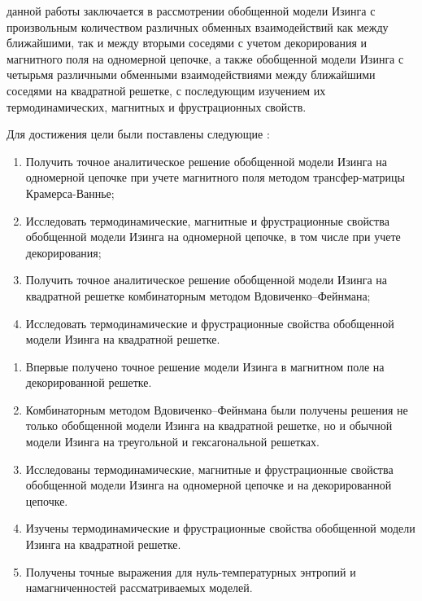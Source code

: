 {\aim} данной работы заключается в рассмотрении обобщенной	модели Изинга с произвольным количеством различных обменных взаимодействий как между ближайшими, так и между вторыми соседями с учетом декорирования и магнитного поля на одномерной цепочке, а также обобщенной модели Изинга с четырьмя различными обменными взаимодействиями между ближайшими соседями на квадратной решетке, с последующим изучением их термодинамических, магнитных и фрустрационных свойств.

Для достижения цели были поставлены следующие {\tasks}:
\begin{enumerate}[beginpenalty=10000] %
  \item Получить точное аналитическое решение обобщенной модели Изинга на одномерной цепочке при учете магнитного поля методом трансфер-матрицы Крамерса-Ваннье;
  \item Исследовать термодинамические, магнитные и фрустрационные свойства обобщенной модели Изинга на одномерной цепочке, в том числе при учете декорирования; 
  \item Получить точное аналитическое решение обобщенной модели Изинга на квадратной решетке комбинаторным методом Вдовиченко--Фейнмана;
  \item Исследовать термодинамические и фрустрационные свойства обобщенной модели Изинга на квадратной решетке.
\end{enumerate}

{\novelty}
\begin{enumerate}[beginpenalty=10000] %
  \item Впервые получено точное решение модели Изинга в магнитном поле на декорированной решетке.
  \item Комбинаторным методом Вдовиченко--Фейнмана были получены решения не только обобщенной модели Изинга на квадратной решетке, но и обычной модели Изинга на треугольной и гексагональной решетках.
  \item Исследованы термодинамические, магнитные и фрустрационные свойства обобщенной модели Изинга на одномерной цепочке и на декорированной цепочке.
  \item Изучены термодинамические и фрустрационные свойства обобщенной модели Изинга на квадратной решетке.
  \item Получены точные выражения для нуль-температурных энтропий и намагниченностей рассматриваемых моделей.
\end{enumerate}

